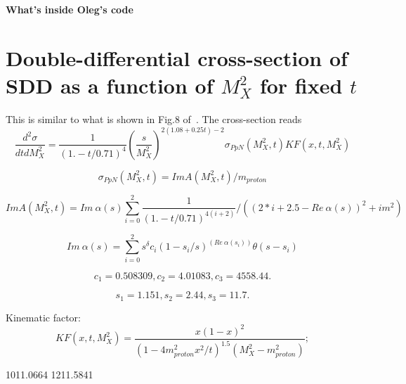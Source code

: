 \documentclass[12pt]{article}
\begin{document}
\vskip 0.5cm \centerline{\bf\Large What's inside Oleg's code}
\vskip 1cm

\section{Double-differential cross-section of SDD as a function of $M_X^2$ for fixed $t$}
This is similar to what is shown in Fig.8 of~\cite{Jenkovszky11}.
The cross-section reads
$$
\frac{d^2\sigma}{dt dM_X^2}=\frac{1}{(1. - t/0.71)^4} \left(\frac{s}{M_X^2}\right)^{2(1.08 + 0.25t) - 2} \sigma_{PpN}(M_X^2,t) KF(x,t,M_X^2)
$$


$$
\sigma_{PpN}(M_X^2,t)=Im A(M_X^2,t) / m_{proton}
$$

$$
Im A(M_X^2,t) = Im\ \alpha(s) \sum_{i=0}^{2}\frac{1}{(1. - t/0.71)^{4(i+2)}} / ((2*i+2.5-Re\ \alpha(s))^2+im^2)
$$

$$
Im\ \alpha(s) = \sum_{i=0}^{2} s^\delta c_i (1-s_i/s)^(Re\ \alpha(s_i)) \theta(s-s_i) 
$$

$$
c_1=  0.508309,
c_2 = 4.01083,
c_3 = 4558.44.
$$
  
$$
s_1=  1.151,
s_2 = 2.44,
s_3 = 11.7.
$$

Kinematic factor:
$$
KF(x,t,M_X^2) = \frac{x (1-x)^2}{\left(1 - 4m_{proton}^2x^2/t\right)^{1.5}(M_X^2-m_{proton}^2)};
$$




\begin{thebibliography}{99}
 1011.0664
 1211.5841
\end{thebibliography}
\end{document}
